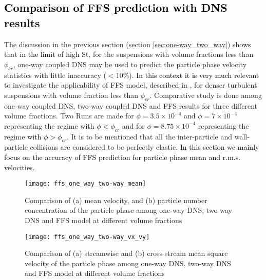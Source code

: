 \documentclass[notitlepage]{revtex4-1}
\begin{document}
\subsection{\textcolor{black}{Comparison of FFS prediction with DNS results}}
\label{one-way_two_way_FFS}
The discussion in the previous section (section \ref{sec:one-way_two_way}) shows that \textcolor{black}{in the limit of high St}, for the suspensions with volume fractions less than $\phi_{cr}$, one-way coupled DNS \textcolor{black}{may} be used to predict the particle phase velocity statistics with little inaccuracy ($<10\%$). \textcolor{black}{In this context it is very much} relevant to investigate the applicability of FFS model, \textcolor{black}{described} in \citet{goswami2010particle}, for denser turbulent suspensions with volume fraction less than $\phi_{cr}$.
Comparative study is done among one-way coupled DNS, two-way coupled DNS and FFS results for three different volume fractions. Two Runs are made for $\phi=3.5\times10^{-4}$ and $\phi=7\times10^{-4}$ representing the regime \textcolor{black}{with $\phi<\phi_{cr}$} and for $\phi=8.75\times10^{-4}$ representing the regime \textcolor{black}{with $\phi>\phi_{cr}$}. It is to be mentioned that all the inter-particle and wall-particle collisions are considered to be perfectly elastic. \textcolor{black}{In this section we mainly focus on the accuracy of FFS prediction for particle phase mean and r.m.s. velocities.}
\begin{figure*}[!]
			\texttt{[image: ffs\_one\_way\_two-way\_mean]}
			\caption{Comparison of (a) mean velocity, and (b) particle number concentration of the particle phase among one-way DNS, two-way DNS and FFS model at different volume fractions} 
			\label{fig:particle_phase_stat1_1way_2way_ffs}
\end{figure*}
\begin{figure*}[!]
			\texttt{[image: ffs\_one\_way\_two-way\_vx\_vy]}
			\caption{Comparison of (a) streamwise and (b) cross-stream mean square velocity of the particle phase among one-way DNS, two-way DNS and FFS model at different volume fractions}
			\label{fig:particle_phase_stat2_1way_2way_ffs} 
\end{figure*} 
\end{document}
